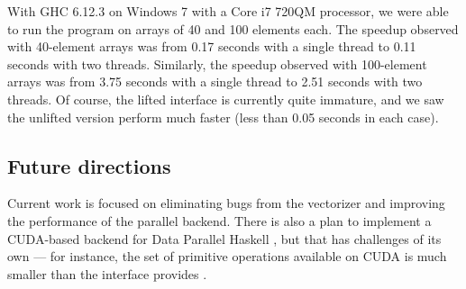 \documentclass[a4paper]{acmtrans2m}
\begin{document}
With GHC 6.12.3 on Windows 7 with a Core i7 720QM processor, we were able to run the
program on arrays of 40 and 100 elements each. The speedup observed with 40-element
arrays was from 0.17 seconds with a single thread to 0.11 seconds with two threads.
Similarly, the speedup observed with 100-element arrays was from 3.75 seconds with a
single thread to 2.51 seconds with two threads. Of course, the lifted interface is
currently quite immature, and we saw the unlifted version perform much faster (less
than 0.05 seconds in each case).

\subsection{Future directions}

Current work is focused on eliminating bugs from the vectorizer and improving the 
performance of the parallel backend. There is also a plan to implement a CUDA-based
backend for Data Parallel Haskell \cite{Dijk:2008}, but that has challenges of its own --- for
instance, the set of primitive operations available on CUDA is much smaller than the 
interface provides \cite{Leshchinskiy:2008}.



\end{document}
